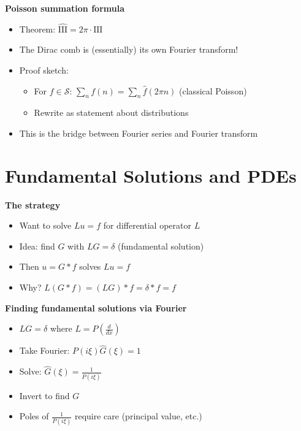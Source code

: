 \documentclass[
  10pt,
  letterpaper,
]{scrbook}
\providecommand{\tightlist}{%
  \setlength{\itemsep}{0pt}\setlength{\parskip}{0pt}}
\begin{document}
\textbf{Poisson summation formula}

\begin{itemize}
\tightlist
\item
  Theorem: \(\widehat{\text{III}} = 2\pi \cdot \text{III}\)
\item
  The Dirac comb is (essentially) its own Fourier transform!
\item
  Proof sketch:

  \begin{itemize}
  \tightlist
  \item
    For \(f \in \mathcal{S}\): \(\sum_n f(n) = \sum_n \hat{f}(2\pi n)\)
    (classical Poisson)
  \item
    Rewrite as statement about distributions
  \end{itemize}
\item
  This is the bridge between Fourier series and Fourier transform
\end{itemize}

\section{Fundamental Solutions and
PDEs}\label{fundamental-solutions-and-pdes}

\textbf{The strategy}

\begin{itemize}
\tightlist
\item
  Want to solve \(Lu = f\) for differential operator \(L\)
\item
  Idea: find \(G\) with \(LG = \delta\) (fundamental solution)
\item
  Then \(u = G * f\) solves \(Lu = f\)
\item
  Why? \(L(G * f) = (LG) * f = \delta * f = f\)
\end{itemize}

\textbf{Finding fundamental solutions via Fourier}

\begin{itemize}
\tightlist
\item
  \(LG = \delta\) where \(L = P(\frac{d}{dx})\)
\item
  Take Fourier: \(P(i\xi)\hat{G}(\xi) = 1\)
\item
  Solve: \(\hat{G}(\xi) = \frac{1}{P(i\xi)}\)
\item
  Invert to find \(G\)
\item
  Poles of \(\frac{1}{P(i\xi)}\) require care (principal value, etc.)
\end{itemize}
\end{document}
